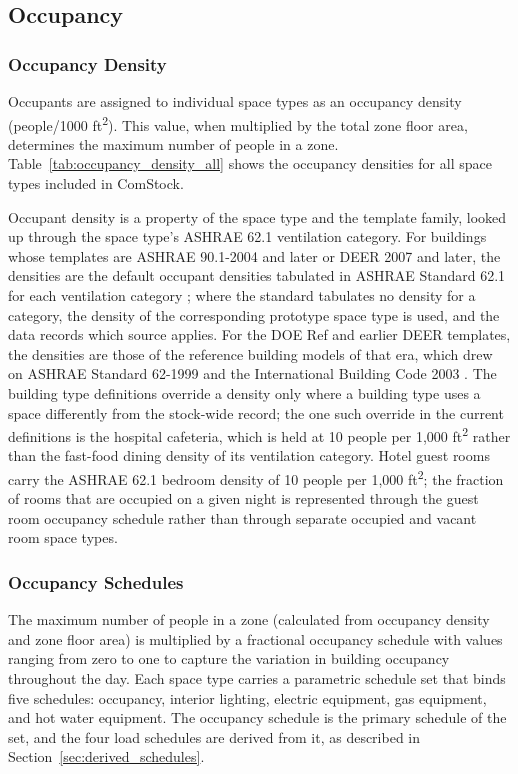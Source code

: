 \subsection{Occupancy}
\subsubsection{Occupancy Density}
Occupants are assigned to individual space types as an occupancy density (people/1000 ft\textsuperscript{2}). This value, when multiplied by the total zone floor area, determines the maximum number of people in a zone. Table~\ref{tab:occupancy_density_all} shows the occupancy densities for all space types included in ComStock.

Occupant density is a property of the space type and the template family, looked up through the space type's ASHRAE 62.1 ventilation category. For buildings whose templates are ASHRAE 90.1-2004 and later or DEER 2007 and later, the densities are the default occupant densities tabulated in ASHRAE Standard 62.1 for each ventilation category \citep{ashrae_62.1_2004}; where the standard tabulates no density for a category, the density of the corresponding prototype space type is used, and the data records which source applies. For the DOE Ref and earlier DEER templates, the densities are those of the reference building models of that era, which drew on ASHRAE Standard 62-1999 and the International Building Code 2003 \citep{icc_2003}. The building type definitions override a density only where a building type uses a space differently from the stock-wide record; the one such override in the current definitions is the hospital cafeteria, which is held at 10 people per 1,000 ft\textsuperscript{2} rather than the fast-food dining density of its ventilation category. Hotel guest rooms carry the ASHRAE 62.1 bedroom density of 10 people per 1,000 ft\textsuperscript{2}; the fraction of rooms that are occupied on a given night is represented through the guest room occupancy schedule rather than through separate occupied and vacant room space types.

\subsubsection{Occupancy Schedules}
\label{sec:parametric_schedules}
The maximum number of people in a zone (calculated from occupancy density and zone floor area) is multiplied by a fractional occupancy schedule with values ranging from zero to one to capture the variation in building occupancy throughout the day. Each space type carries a parametric schedule set that binds five schedules: occupancy, interior lighting, electric equipment, gas equipment, and hot water equipment. The occupancy schedule is the primary schedule of the set, and the four load schedules are derived from it, as described in Section~\ref{sec:derived_schedules}.

